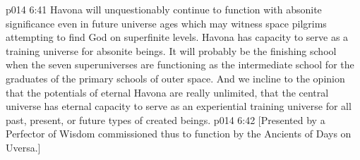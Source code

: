 \vs p014 6:41 \pc Havona will unquestionably continue to function with absonite significance even in future universe ages which may witness space pilgrims attempting to find God on superfinite levels. Havona has capacity to serve as a training universe for absonite beings. It will probably be the finishing school when the seven superuniverses are functioning as the intermediate school for the graduates of the primary schools of outer space. And we incline to the opinion that the potentials of eternal Havona are really unlimited, that the central universe has eternal capacity to serve as an experiential training universe for all past, present, or future types of created beings.
\vsetoff
\vs p014 6:42 [Presented by a Perfector of Wisdom commissioned thus to function by the Ancients of Days on Uversa.]
\quizlink
